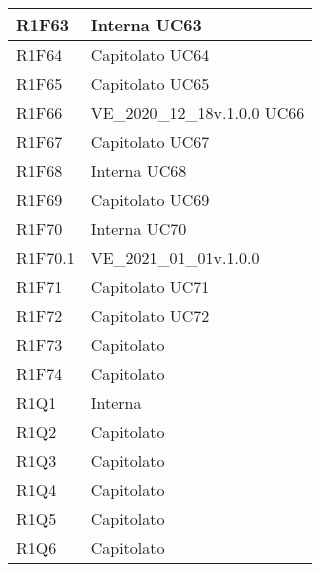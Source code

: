 \begin{center}
\begin{longtable}{|p{22mm}|p{44mm}|}
R1F63 &
Interna \newline
UC63 
\\
\hline

R1F64 &
Capitolato \newline
UC64 
\\
\hline

R1F65 &
Capitolato \newline
UC65 
\\
\hline

R1F66 &
VE\_2020\_12\_18v.1.0.0 \newline
UC66 
\\
\hline

R1F67 &
Capitolato \newline
UC67 
\\
\hline

R1F68 &
Interna \newline
UC68 
\\
\hline

R1F69 &
Capitolato \newline
UC69 
\\
\hline

R1F70 &
Interna \newline
UC70 
\\
\hline

R1F70.1 &
VE\_2021\_01\_01v.1.0.0 
\\
\hline

R1F71 &
Capitolato \newline
UC71 
\\
\hline

R1F72 &
Capitolato \newline
UC72 
\\
\hline

R1F73 &
Capitolato 
\\
\hline

R1F74 &
Capitolato 
\\
\hline

 R1Q1 &
Interna 
\\
\hline

R1Q2 &
Capitolato 
\\
\hline

R1Q3 &
Capitolato 
\\
\hline

R1Q4 &
Capitolato 
\\
\hline

R1Q5 &
Capitolato 
\\
\hline

R1Q6 &
Capitolato 
\\
\hline


\end{longtable}
\end{center}
